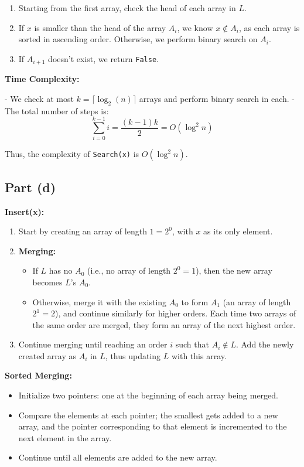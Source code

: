 \documentclass{article}
\begin{document}
\begin{enumerate}
    \item Starting from the first array, check the head of each array in \( L \).
    \item If \( x \) is smaller than the head of the array \( A_i \), we know \( x \notin A_i \), as each array is sorted in ascending order. Otherwise, we perform binary search on \( A_i \).
    \item If \( A_{i+1} \) doesn’t exist, we return \texttt{False}.
\end{enumerate}

\textbf{Time Complexity:}

- We check at most \( k = \lceil \log_2(n) \rceil \) arrays and perform binary search in each.
- The total number of steps is:
  \[
  \sum_{i=0}^{k-1} i = \frac{(k-1)k}{2} = O(\log^2 n)
  \]
  
Thus, the complexity of \texttt{Search(x)} is \( O(\log^2 n) \).

\subsection*{Part (d)}
\textbf{Insert(x):}

\begin{enumerate}
    \item Start by creating an array of length \( 1 = 2^0 \), with \( x \) as its only element.
    \item \textbf{Merging:}
    \begin{itemize}
        \item If \( L \) has no \( A_0 \) (i.e., no array of length \( 2^0 = 1 \)), then the new array becomes \( L \)'s \( A_0 \).
        \item Otherwise, merge it with the existing \( A_0 \) to form \( A_1 \) (an array of length \( 2^1 = 2 \)), and continue similarly for higher orders. Each time two arrays of the same order are merged, they form an array of the next highest order.
    \end{itemize}
    \item Continue merging until reaching an order \( i \) such that \( A_i \notin L \). Add the newly created array as \( A_i \) in \( L \), thus updating \( L \) with this array.
\end{enumerate}

\textbf{Sorted Merging:}
\begin{itemize}
    \item Initialize two pointers: one at the beginning of each array being merged.
    \item Compare the elements at each pointer; the smallest gets added to a new array, and the pointer corresponding to that element is incremented to the next element in the array.
    \item Continue until all elements are added to the new array.
\end{itemize}
\end{document}
